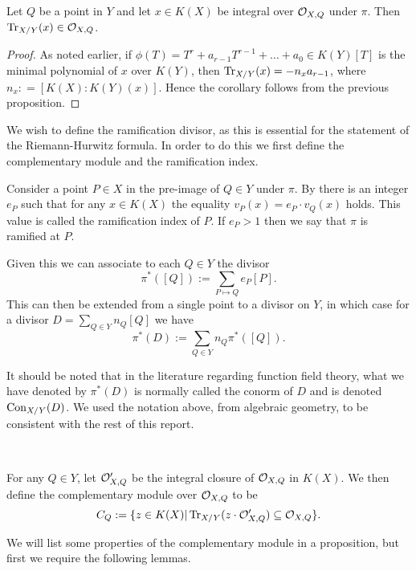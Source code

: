 \begin{cor}\label{traceinclosure}
Let $Q$ be a point in $Y$ and let $x\in K(X)$ be integral over ${\cal O}_{X,Q}$ under $\pi$.
 Then $\operatorname{Tr}_{X/Y}(x)\in {\cal O}_{X,Q}$.
\end{cor}
\begin{proof}
 As noted earlier, if $\phi(T)=T^r+a_{r-1}T^{r-1} + \ldots + a_0\in K(Y)[T]$ is the minimal polynomial of $x$ over $K(Y)$, then $\operatorname{Tr}_{X/Y}(x)=-n_xa_{r-1}$, where $n_x : = [K(X):K(Y)(x)]$.
 Hence the corollary follows from the previous proposition.
\end{proof}


We wish to define the ramification divisor, as this is essential for the statement of the Riemann-Hurwitz formula.
In order to do this we first define the complementary module and the ramification index.


\begin{defn}
 Consider a point $P\in X$ in the pre-image of $Q\in Y$ under $\pi$.
 By \cite[Prop. III.1.4]{stichtenoth} there is an integer $e_P$ such that for any $x\in K(X)$ the equality $v_P(x) = e_P\cdot v_Q(x)$ holds.
 This value is called the ramification index of $P$.
 If $e_P>1$ then we say that $\pi$ is ramified at $P$.
\end{defn}

Given this we can associate to each $Q\in Y$ the divisor
\[
 \pi^*([Q]) := \sum_{P\mapsto Q} e_P [P].
\]
This can then be extended from a single point to a divisor on $Y$, in which case for a divisor $D = \sum_{Q\in Y}n_Q [Q]$ we have
\[
 \pi^*(D) := \sum_{Q\in Y}n_Q \pi^*([Q]).
\]

\begin{rem}
It should be noted that in the literature regarding function field theory, what we have denoted by $\pi^*(D)$ is normally called the conorm of $D$ and is denoted ${\rm Con}_{X/Y}(D)$. 
We used the notation above, from algebraic geometry, to be consistent with the rest of this report.
\end{rem}
~

\begin{defn}
 For any $Q\in Y$, let ${\cal O}_{X,Q}'$ be the integral closure of ${\cal O}_{X,Q}$ in $K(X)$.
 We then define the complementary module over ${\cal O}_{X,Q}$ to be
 \[
  C_Q :=\{z\in K(X) | \operatorname{Tr}_{X/Y}(z\cdot {\cal O}_{X,Q}') \subseteq {\cal O}_{X,Q}\}.
 \]
\end{defn}


We will list some properties of the complementary module in a proposition, but first we require the following lemmas.

